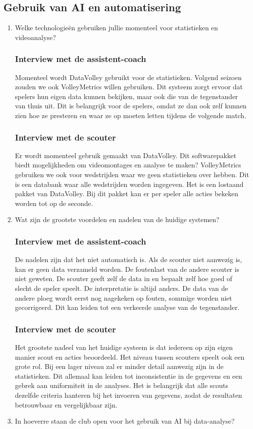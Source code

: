\subsection{Gebruik van AI en automatisering}
\begin{enumerate}
  \item Welke technologieën gebruiken jullie momenteel voor statistieken en videoanalyse?
  \subsubsection{Interview met de assistent-coach}
  Momenteel wordt DataVolley gebruikt voor de statistieken. Volgend seizoen zouden we ook VolleyMetrics willen gebruiken. Dit systeem zorgt ervoor dat spelers hun eigen data kunnen bekijken, maar ook die van de tegenstander van thuis uit. Dit is belangrijk voor de spelers, omdat ze dan ook zelf kunnen zien hoe ze presteren en waar ze op moeten letten tijdens de volgende match.
  \subsubsection{Interview met de scouter}
  Er wordt momenteel gebruik gemaakt van DataVolley. Dit softwarepakket biedt mogelijkheden om videomontages en analyse te maken? VolleyMetrics gebruiken we ook voor wedstrijden waar we geen statistieken over hebben. Dit is een databank waar alle wedstrijden worden ingegeven. Het is een lostaand pakket van DataVolley. Bij dit pakket kan er per speler alle acties bekeken worden tot op de seconde. 
  \item Wat zijn de grootste voordelen en nadelen van de huidige systemen?
  \subsubsection{Interview met de assistent-coach}
  De nadelen zijn dat het niet automatisch is. Als de scouter niet aanwezig is, kan er geen data verzameld worden. De foutenlast van de andere scouter is niet geweten. De scouter geeft zelf de data in en bepaalt zelf hoe goed of slecht de speler speelt. De interpretatie is altijd anders. De data van de andere ploeg wordt eerst nog nagekeken op fouten, sommige worden niet gecorrigeerd. Dit kan leiden tot een verkeerde analyse van de tegenstander.
  \subsubsection{Interview met de scouter}
  Het grootste nadeel van het huidige systeem is dat iedereen op zijn eigen manier scout en acties beoordeeld. Het niveau tussen scouters speelt ook een grote rol. Bij een lager niveau zal er minder detail aanwezig zijn in de statistieken. Dit allemaal kan leiden tot inconsistentie in de gegevens en een gebrek aan uniformiteit in de analyses. Het is belangrijk dat alle scouts dezelfde criteria hanteren bij het invoeren van gegevens, zodat de resultaten betrouwbaar en vergelijkbaar zijn.
  \item In hoeverre staan de club open voor het gebruik van AI bij data-analyse?

\end{enumerate}
